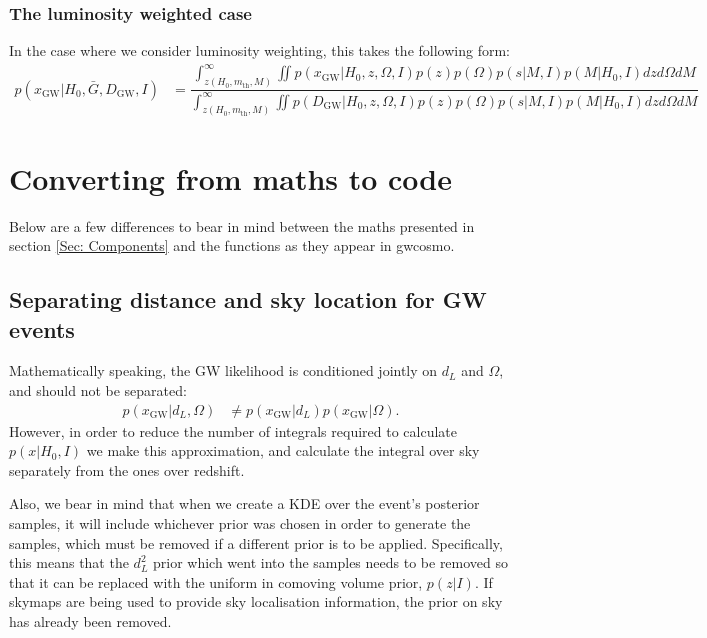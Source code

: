 \documentclass[a4paper,10pt]{article}
\begin{document}
\subsubsection{The luminosity weighted case}
In the case where we consider luminosity weighting, this takes the following form:
\begin{equation}
\begin{aligned}
p(x_{\text{GW}}|H_0,\bar{G},D_{\text{GW}},I) &= \dfrac{\int^\infty_{z(H_0,m_{\text{th}},M)} \iint p(x_{\text{GW}}|H_0,z,\Omega,I) p(z) p(\Omega) p(s|M,I) p(M|H_0,I) dz d\Omega dM}{\int^\infty_{z(H_0,m_{\text{th}},M)} \iint p(D_{\text{GW}}|H_0,z,\Omega,I) p(z) p(\Omega) p(s|M,I) p(M|H_0,I) dz d\Omega dM}
\end{aligned}
\end{equation}





\section{Converting from maths to code \label{Sec: maths2code}}
Below are a few differences to bear in mind between the maths presented in section \ref{Sec: Components} and the functions as they appear in gwcosmo.



\subsection{Separating distance and sky location for GW events}
Mathematically speaking, the GW likelihood is conditioned jointly on $d_L$ and $\Omega$, and should not be separated:
\begin{equation}
\begin{aligned}
p(x_{\text{GW}}|d_L,\Omega) &\neq p(x_{\text{GW}}|d_L) p(x_{\text{GW}}|\Omega).
\end{aligned}
\end{equation}
However, in order to reduce the number of integrals required to calculate $p(x|H_0,I)$ we make this approximation, and calculate the integral over sky separately from the ones over redshift.


Also, we bear in mind that when we create a KDE over the event's posterior samples, it will include whichever prior was chosen in order to generate the samples, which must be removed if a different prior is to be applied.  Specifically, this means that the $d_L^2$ prior which went into the samples needs to be removed so that it can be replaced with the uniform in comoving volume prior, $p(z|I)$.  If skymaps are being used to provide sky localisation information, the prior on sky has already been removed.
\end{document}
